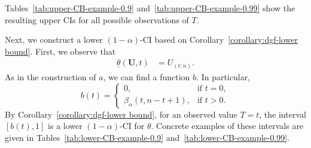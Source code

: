 Tables~\ref{tab:upper-CB-example-0.9} and~\ref{tab:upper-CB-example-0.99} show the resulting upper CIs for all possible observations of $T$. 

Next, we construct a lower \((1-\alpha)\)-CI based on Corollary~\ref{corollary:dgf-lower bound}. First, we observe that
\begin{align}
	\label{precondition for corollary 1}
	\underline{\theta}(\mathbf U,t)
	&= U_{(t:n)}.
\end{align}
As in the construction of \(a\), we can find a function \(b\). In particular,
\[
b(t)=
\begin{cases}
	0, & \text{if } t=0,\\
	\beta_{\alpha}(t,n-t+1), & \text{if } t>0.
\end{cases}
\]
By Corollary~\ref{corollary:dgf-lower bound}, for an observed value \(T=t\), the interval \([b(t),1]\) is a lower \((1-\alpha)\)-CI for \(\theta\). Concrete examples of these intervals are given in Tables~\ref{tab:lower-CB-example-0.9} and~\ref{tab:lower-CB-example-0.99}.

